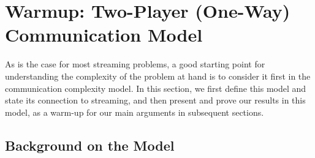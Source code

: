 \documentclass[11pt]{article}
\newtheorem{proposition}[lemma]{Proposition}
\newtheorem{fact}[lemma]{Fact}
\theoremstyle{definition}
\renewcommand{\leq}{\leqslant}
\renewcommand{\geq}{\geqslant}
\newcommand{\II}{\ensuremath{\mathbb{I}}}
\newcommand{\HH}{\ensuremath{\mathbb{H}}}
\newcommand{\mi}[2]{\ensuremath{\def\mione{#1}\def\mitwo{#2}\mireal}}
\newcommand{\mireal}[1][]{
  \ifx\relax#1\relax%
    \II(\mione \,; \mitwo)%
  \else%
    \II(\mione \,; \mitwo\mid #1)%
  \fi
}
\newcommand{\en}[1]{\ensuremath{\HH(#1)}}
\begin{document}
%
%
%

%
%
%
%
%


	
	\clearpage
	

\section{Warmup: Two-Player (One-Way) Communication Model}\label{sec:two-player}

As is the case for most streaming problems, a good starting point for understanding the complexity of the problem at hand is to 
consider it first in the communication complexity model. In this section, we first define this model and state its connection to streaming, and then present and prove our results in this model, as a 
warm-up for our main arguments in subsequent sections. 

\subsection{Background on the Model}\label{sec:two-player-background} 
\end{document}
